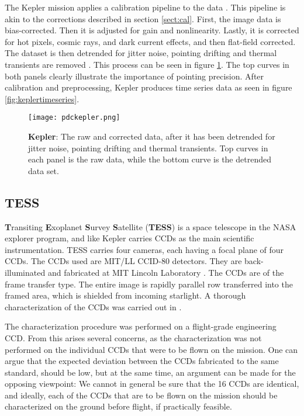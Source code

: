 \documentclass[../main.tex]{subfiles}
\begin{document}
The Kepler mission applies a calibration pipeline to the data \cite{keplerpipeline}. This pipeline is akin to the corrections described in section \ref{sect:cal}. First, the image data is bias-corrected. Then it is adjusted for gain and nonlinearity. Lastly, it is corrected for hot pixels, cosmic rays, and dark current effects, and then flat-field corrected. The dataset is then detrended for jitter noise, pointing drifting and thermal transients are removed \cite{keplerpipeline}. This process can be seen in figure \ref{fig:keplerpdc}. The top curves in both panels clearly illustrate the importance of pointing precision. After calibration and preprocessing, Kepler produces time series data as seen in figure \ref{fig:keplertimeseries}.

\begin{figure}
	\centering
	\texttt{[image: pdckepler.png]}
	\caption{\textbf{Kepler}: The raw and corrected data\cite{keplerpipeline}, after it has been detrended for jitter noise, pointing drifting and thermal transients. Top curves in each panel is the raw data, while the bottom curve is the detrended data set. }
	\label{fig:keplerpdc}
\end{figure}

\subsection{TESS}
\textbf{T}ransiting \textbf{E}xoplanet \textbf{S}urvey \textbf{S}atellite (\textbf{TESS}) is a space telescope in the NASA explorer program, and like Kepler carries CCDs as the main scientific instrumentation. TESS carries four cameras, each having a focal plane of four CCDs. The CCDs used are MIT/LL CCID-80 detectors. They are back-illuminated and fabricated at MIT Lincoln
Laboratory \cite{tesscharacterization}. The CCDs are of the frame transfer type. The entire image is rapidly parallel row transferred into the framed area, which is shielded from incoming starlight. A thorough characterization of the CCDs was carried out in \cite{tesscharacterization}. 

The characterization procedure was performed on a flight-grade engineering CCD. From this arises several concerns, as the characterization was not performed on the individual CCDs that were to be flown on the mission. One can argue that the expected deviation between the CCDs fabricated to the same standard, should be low, but at the same time, an argument can be made for the opposing viewpoint: We cannot in general be sure that the 16 CCDs are identical, and ideally, each of the CCDs that are to be flown on the mission should be characterized on the ground before flight, if practically feasible. 
\end{document}
